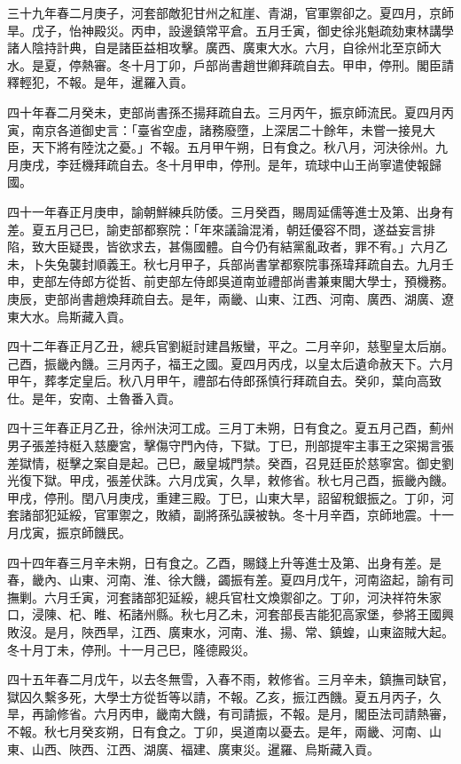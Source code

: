 \begin{pinyinscope}
三十九年春二月庚子，河套部敵犯甘州之紅崖、青湖，官軍禦卻之。夏四月，京師旱。戊子，怡神殿災。丙申，設邊鎮常平倉。五月壬寅，御史徐兆魁疏劾東林講學諸人陰持計典，自是諸臣益相攻擊。廣西、廣東大水。六月，自徐州北至京師大水。是夏，停熱審。冬十月丁卯，戶部尚書趙世卿拜疏自去。甲申，停刑。閣臣請釋輕犯，不報。是年，暹羅入貢。

四十年春二月癸未，吏部尚書孫丕揚拜疏自去。三月丙午，振京師流民。夏四月丙寅，南京各道御史言：「臺省空虛，諸務廢墮，上深居二十餘年，未嘗一接見大臣，天下將有陸沈之憂。」不報。五月甲午朔，日有食之。秋八月，河決徐州。九月庚戌，李廷機拜疏自去。冬十月甲申，停刑。是年，琉球中山王尚寧遣使報歸國。

四十一年春正月庚申，諭朝鮮練兵防倭。三月癸酉，賜周延儒等進士及第、出身有差。夏五月己巳，諭吏部都察院：「年來議論混淆，朝廷優容不問，遂益妄言排陷，致大臣疑畏，皆欲求去，甚傷國體。自今仍有結黨亂政者，罪不宥。」六月乙未，卜失兔襲封順義王。秋七月甲子，兵部尚書掌都察院事孫瑋拜疏自去。九月壬申，吏部左侍郎方從哲、前吏部左侍郎吳道南並禮部尚書兼東閣大學士，預機務。庚辰，吏部尚書趙煥拜疏自去。是年，兩畿、山東、江西、河南、廣西、湖廣、遼東大水。烏斯藏入貢。

四十二年春正月乙丑，總兵官劉綎討建昌叛蠻，平之。二月辛卯，慈聖皇太后崩。己酉，振畿內饑。三月丙子，福王之國。夏四月丙戌，以皇太后遺命赦天下。六月甲午，葬孝定皇后。秋八月甲午，禮部右侍郎孫慎行拜疏自去。癸卯，葉向高致仕。是年，安南、土魯番入貢。

四十三年春正月乙丑，徐州決河工成。三月丁未朔，日有食之。夏五月己酉，薊州男子張差持梃入慈慶宮，擊傷守門內侍，下獄。丁巳，刑部提牢主事王之寀揭言張差獄情，梃擊之案自是起。己巳，嚴皇城門禁。癸酉，召見廷臣於慈寧宮。御史劉光復下獄。甲戌，張差伏誅。六月戊寅，久旱，敕修省。秋七月己酉，振畿內饑。甲戌，停刑。閏八月庚戌，重建三殿。丁巳，山東大旱，詔留稅銀振之。丁卯，河套諸部犯延綏，官軍禦之，敗績，副將孫弘謨被執。冬十月辛酉，京師地震。十一月戊寅，振京師饑民。

四十四年春三月辛未朔，日有食之。乙酉，賜錢上升等進士及第、出身有差。是春，畿內、山東、河南、淮、徐大饑，蠲振有差。夏四月戊午，河南盜起，諭有司撫剿。六月壬寅，河套諸部犯延綏，總兵官杜文煥禦卻之。丁卯，河決祥符朱家口，浸陳、杞、睢、柘諸州縣。秋七月乙未，河套部長吉能犯高家堡，參將王國興敗沒。是月，陜西旱，江西、廣東水，河南、淮、揚、常、鎮蝗，山東盜賊大起。冬十月丁未，停刑。十一月己巳，隆德殿災。

四十五年春二月戊午，以去冬無雪，入春不雨，敕修省。三月辛未，鎮撫司缺官，獄囚久繫多死，大學士方從哲等以請，不報。乙亥，振江西饑。夏五月丙子，久旱，再諭修省。六月丙申，畿南大饑，有司請振，不報。是月，閣臣法司請熱審，不報。秋七月癸亥朔，日有食之。丁卯，吳道南以憂去。是年，兩畿、河南、山東、山西、陜西、江西、湖廣、福建、廣東災。暹羅、烏斯藏入貢。


\end{pinyinscope}
